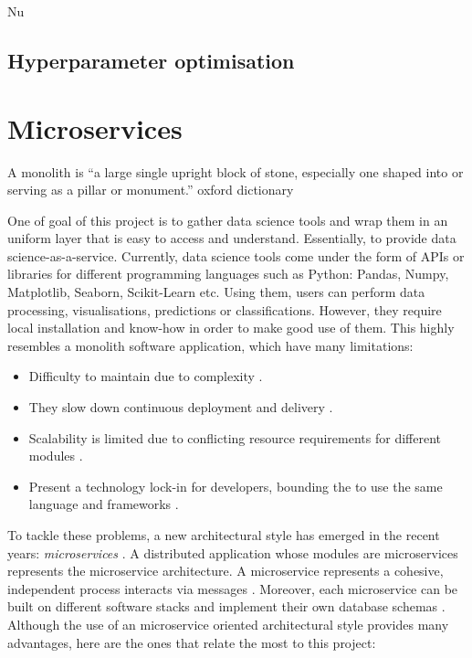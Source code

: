 Nu\documentclass[11pt,twoside, a4paper]{report}
\begin{document}
\subsection{Hyperparameter optimisation}

\section{Microservices}

A monolith is “a large single upright block of stone, especially one shaped into or serving as a pillar or monument.” oxford dictionary

One of goal of this project is to gather data science tools and wrap them in an uniform layer that is easy to access and understand. Essentially, to provide data science-as-a-service. Currently, data science tools come under the form of APIs or libraries for different programming languages such as Python: Pandas, Numpy, Matplotlib, Seaborn, Scikit-Learn etc. Using them, users can perform data processing, visualisations, predictions or classifications. However, they require local installation and know-how in order to make good use of them. This highly resembles a monolith software application, which have many limitations:
\begin{itemize}
    \item Difficulty to maintain due to complexity \parencite{Mazzara2017}.
    \item They slow down continuous deployment and delivery \parencite{Sarita2018}.
    \item Scalability is limited due to conflicting resource requirements for different modules \parencite{Sarita2018}.
    \item Present a technology lock-in for developers, bounding the to use the same language and frameworks \parencite{Mazzara2017}.
\end{itemize}
To tackle these problems, a new architectural style has emerged in the recent years: \emph{microservices} \parencite{FowlerMicroservices}. A distributed application whose modules are microservices represents the microservice architecture. A microservice represents a cohesive, independent process interacts via messages \parencite{Mazzara2017}. Moreover, each microservice can be built on different software stacks and implement their own database schemas \parencite{Kinnary2018ADVU}. Although the use of an microservice oriented architectural style provides many advantages, here are the ones that relate the most to this project:
\end{document}
